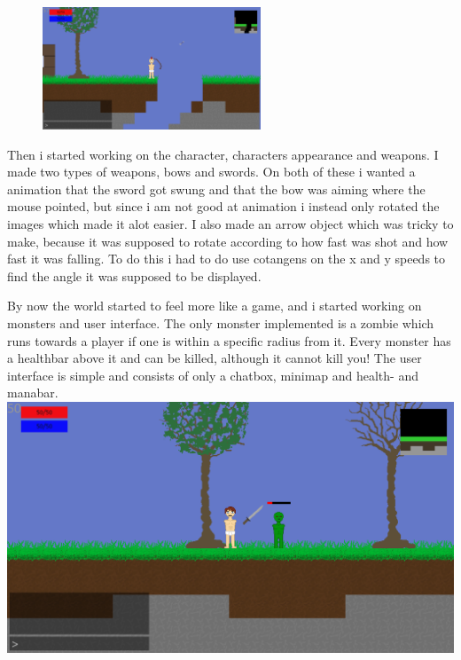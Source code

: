 \documentclass[a4paper,12pt]{article}
\begin{document}
\begin{figure}
    \vspace{-20pt}
    \begin{center}
        \includegraphics[width=0.58\textwidth]{img/screenshot2.eps}
    \end{center}
    \vspace{-20pt}
\end{figure}
Then i started working on the character, characters appearance and weapons.
I made two types of weapons, bows and swords.
On both of these i wanted a animation that the sword got swung and that the bow was aiming where the mouse pointed, but since i am not good at animation i instead only rotated the images which made it alot easier.
I also made an arrow object which was tricky to make, because it was supposed to rotate according to how fast was shot and how fast it was falling. 
To do this i had to do use cotangens on the x and y speeds to find the angle it was supposed to be displayed.


By now the world started to feel more like a game, and i started working on monsters and user interface.
The only monster implemented is a zombie which runs towards a player if one is within a specific radius from it.
Every monster has a healthbar above it and can be killed, although it cannot kill you!
The user interface is simple and consists of only a chatbox, minimap and health- and manabar.
\\

\includegraphics[width=\textwidth]{img/screenshot3.eps}
\end{document}
